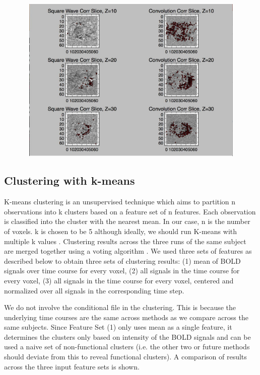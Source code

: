 \documentclass[11pt]{article}
\begin{document}
\includegraphics[width=16cm, height=8cm]{correlations.jpg}


\subsection{Clustering with k-means}

K-means clustering is an unsupervised technique which aims to partition n
observations into k clusters based on a feature set of n features. Each
observation is classified into the cluster with the nearest mean. In our case, n
is the number of voxels. k is chosen to be 5 although ideally, we should run
K-means with multiple k values \cite{venkataraman2009}. Clustering results
across the three runs of the same subject are merged together using a voting
algorithm \cite{dimitriadou2002}. We used three sets of features as described
below to obtain three sets of clustering results: (1) mean of BOLD signals over
time course for every voxel, (2) all signals in the time course for every voxel,
(3) all signals in the time course for every voxel, centered and normalized over
all signals in the corresponding time step. 

We do not involve the conditional file in the clustering. This is because the
underlying time courses are the same across methods as we compare across the
same subjects. Since Feature Set (1) only uses mean as a single feature, it
determines the clusters only based on intensity of the BOLD signals and can be
used a naive set of non-functional clusters (i.e. the other two or future
methods should deviate from this to reveal functional clusters). A comparison of
results across the three input feature sets is shown.
\end{document}
